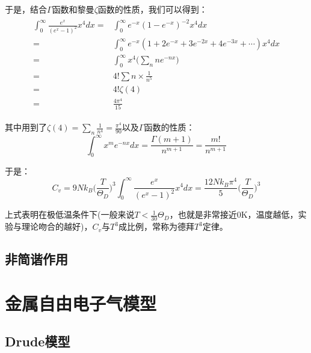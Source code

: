 \documentclass{ctexart}
\begin{document}
                于是，结合$\Gamma$函数和黎曼$\zeta$函数的性质，我们可以得到：
                \begin{align}
                    \begin{split}
                        \int_0^\infty \frac{e^{x}}{(e^{x}-1)^2}x^4dx=&\int_0^\infty e^{-x}(1-e^{-x})^{-2}x^4dx\\
                        =&  \int_0^\infty e^{-x}(1+2e^{-x}+3e^{-2x}+4e^{-3x}+\cdots)x^4dx\\
                        =& \int_0^\infty x^4 \Big(\sum_n n e^{-nx}\Big)\\
                        =& 4! \sum n\times \frac{1}{n^5}\\
                        =& 4! \zeta(4)\\
                        =& \frac{4\pi^4}{15}
                    \end{split}
                \end{align}
                
                其中用到了$\zeta(4)=\sum_n \frac{1}{n^4}=\frac{\pi^4}{90}$以及$\Gamma$函数的性质：
                \begin{equation}
                    \int_0^\infty x^m e^{-nx}dx=\frac{\Gamma(m+1)}{n^{m+1}}=\frac{m!}{n^{m+1}}
                \end{equation}
                
                于是：
                \begin{equation}
                    C_v=9Nk_B\Big(\frac{T}{\Theta_D}\Big)^3\int_0^\infty \frac{e^{x}}{(e^{x}-1)^2}x^4dx=\frac{12Nk_B\pi^4}{5}\Big(\frac{T}{\Theta_D}\Big)^3
                \end{equation}
                
                上式表明在极低温条件下(一般来说$T<\frac{1}{30}\Theta_D$，也就是非常接近0K，温度越低，实验与理论吻合的越好)，$C_v$与$T^3$成比例，常称为德拜$T^3$定律。
                
                \subsection{非简谐作用}
                
            
            \newpage
            \section{金属自由电子气模型}
            \subsection{Drude模型}
\end{document}
